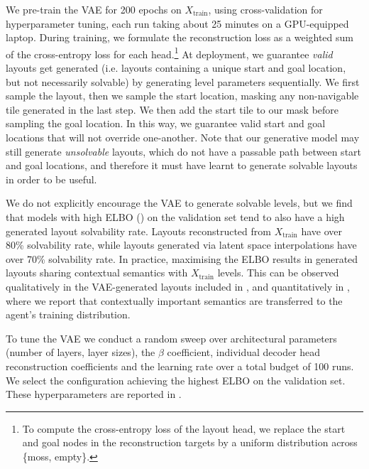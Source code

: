 We pre-train the VAE for 200 epochs on $X_\text{train}$, using cross-validation for hyperparameter tuning, each run taking about 25 minutes on a GPU-equipped laptop. During training, we formulate the reconstruction loss as a weighted sum of the cross-entropy loss for each head.\footnote{To compute the cross-entropy loss of the layout head, we replace the start and goal nodes in the reconstruction targets by a uniform distribution across \{moss, empty\}.}%
At deployment, we guarantee \textit{valid} layouts  get generated (i.e. layouts containing a unique start and goal location, but not necessarily solvable) by generating level parameters sequentially. We first sample the layout, then we sample the start location, masking any non-navigable tile generated in the last step. We then add the start tile to our mask before sampling the goal location. In this way, we guarantee valid start and goal locations that will not override one-another. Note that our generative model may still generate \textit{unsolvable} layouts, which do not have a passable path between start and goal locations, and therefore it must have learnt to generate solvable layouts in order to be useful. 

We do not explicitly encourage the VAE to generate solvable levels, but we find that models with high ELBO () on the validation set tend to also have a high generated layout solvability rate. Layouts reconstructed from $X_\text{train}$ have over 80\% solvability rate, while layouts generated via latent space interpolations have over 70\% solvability rate. In practice, maximising the ELBO results in generated layouts sharing contextual semantics with $X_\text{train}$ levels. This can be observed qualitatively in the VAE-generated layouts included in , and quantitatively in , where we report that contextually important semantics are transferred to the agent's training distribution.

To tune the VAE we conduct a random sweep over architectural parameters (number of layers, layer sizes), the $\beta$ coefficient, individual decoder head reconstruction coefficients and the learning rate over a total budget of 100 runs. We select the configuration achieving the highest ELBO on the validation set. These hyperparameters are reported in %
.

